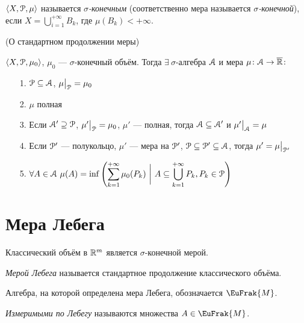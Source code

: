 \begin{definition}
    $\langle X, \mathcal{P}, \mu \rangle$ называется \textit{$\sigma$-конечным} (соответственно
    мера называется \textit{$\sigma$-конечной}), если $\displaystyle
    X = \bigcup_{i = 1}^{+\infty}{B_k}$, где $\mu(B_k) < +\infty$.
\end{definition}

\begin{theorem}(О стандартном продолжении меры)

    $\langle X, \mathcal{P}, \mu_0 \rangle$, $\mu_0$ --- $\sigma$-конечный объём. Тогда
    $\exists~ \sigma$-алгебра $\mathcal{A}$ и мера $\mu \colon \mathcal{A} \to \overline{\mathbb{R}}\colon$
    \begin{itemize}
        \item[1.] $\mathcal{P} \subseteq \mathcal{A}$, $\mu\big|_{\mathcal{P}} = \mu_0$
        \item[2.] $\mu$ полная
        \item[3.] Если $\mathcal{A}' \supseteq \mathcal{P}$, $\mu'\big|_{\mathcal{P}} = \mu_0$,
        $\mu'$ --- полная, тогда $\mathcal{A} \subseteq \mathcal{A}'$ и $\mu'\big|_{\mathcal{A}} = \mu$
        \item[4.] Если $\mathcal{P}'$ --- полукольцо, $\mu'$ --- мера на $\mathcal{P}'$,
        $\mathcal{P} \subseteq \mathcal{P}' \subseteq \mathcal{A}$, тогда $\mu' = \mu\big|_{\mathcal{P}'}$
        \item[5.] $\displaystyle \forall A \in \mathcal{A}~ \mu(A) =
        \inf{\left(\sum_{k = 1}^{+\infty}{\mu_0(P_k)} ~\bigg|~ A \subseteq \bigcup_{k = 1}
        ^{+\infty}{P_k}, P_k \in \mathcal{P}\right)}$
    \end{itemize}
\end{theorem}

\section{Мера Лебега}

\begin{theorem}
    Классический объём в $\mathbb{R}^m$ является $\sigma$-конечной мерой.
\end{theorem}

\begin{definition}
    \textit{Мерой Лебега} называется стандартное продолжение классического объёма.
\end{definition}

\begin{definition}
    Алгебра, на которой определена мера Лебега, обозначается $\EuFrak{M}$.
\end{definition}

\begin{definition}
    \textit{Измеримыми по Лебегу} называются множества $A \in \EuFrak{M}$.
\end{definition}

